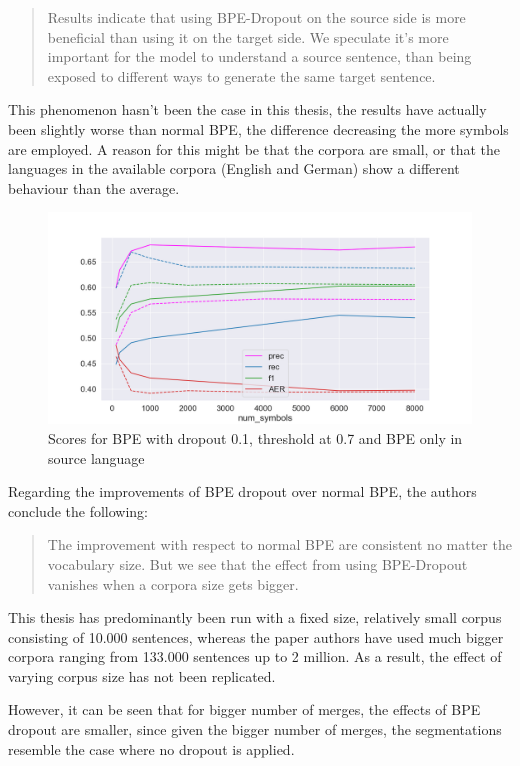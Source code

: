 \begin{quote}
	Results indicate that using BPE-Dropout on the source side is more beneficial than using it on the target side. We speculate it's more important for the model to understand a source sentence, than being exposed to different ways to generate the same target sentence.
\end{quote}

This phenomenon hasn't been the case in this thesis, the results have actually been slightly worse than normal BPE, the difference decreasing the more symbols are employed. A reason for this might be that the corpora are small, or that the languages in the available corpora (English and German) show a different behaviour than the average.

\begin{figure}[!ht]
    \centering
    \includegraphics[width=11.5cm]{../reports/scores_dropout_bpe/space/0.1/0.7_thres_fastalign_eng.png}
    \caption{Scores for BPE with dropout 0.1, threshold at 0.7 and BPE only in source language}
\end{figure}

Regarding the improvements of BPE dropout over normal BPE, the authors conclude the following:

\begin{quote}
	The improvement with respect to normal BPE are consistent no matter the vocabulary size. But we see that the effect from using BPE-Dropout vanishes when a corpora size gets bigger.
\end{quote}

This thesis has predominantly been run with a fixed size, relatively small corpus consisting of 10.000 sentences, whereas the paper authors have used much bigger corpora ranging from 133.000 sentences up to 2 million. As a result, the effect of varying corpus size has not been replicated. 

However, it can be seen that for bigger number of merges, the effects of BPE dropout are smaller, since given the bigger number of merges, the segmentations resemble the case where no dropout is applied.

